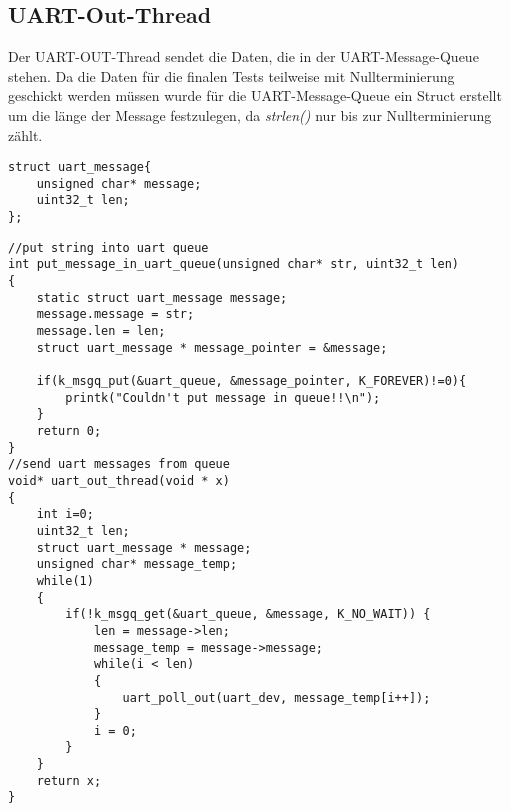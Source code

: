 \newpage
\subsection{UART-Out-Thread}
Der UART-OUT-Thread sendet die Daten, die in der UART-Message-Queue stehen. 
Da die Daten für die finalen Tests teilweise mit Nullterminierung geschickt werden müssen wurde für die UART-Message-Queue ein Struct 
erstellt um die länge der Message festzulegen, da \textit{strlen()} nur bis zur Nullterminierung zählt.
\begin{lstlisting}[style=StyleC, captionpos=b, caption=uart\_message-struct label=uart-message-struct]
struct uart_message{
    unsigned char* message; 
    uint32_t len; 
};
\end{lstlisting}
\begin{lstlisting}[style=StyleC, captionpos=b, caption=UART-OUT-Thread, label=UART-OUT-Thread]
//put string into uart queue
int put_message_in_uart_queue(unsigned char* str, uint32_t len)
{	
    static struct uart_message message; 
    message.message = str; 
    message.len = len;
    struct uart_message * message_pointer = &message;
    
    if(k_msgq_put(&uart_queue, &message_pointer, K_FOREVER)!=0){
        printk("Couldn't put message in queue!!\n");
    }
    return 0;
}    
//send uart messages from queue
void* uart_out_thread(void * x)
{
	int i=0;
	uint32_t len; 
	struct uart_message * message;
	unsigned char* message_temp;
	while(1)
	{
		if(!k_msgq_get(&uart_queue, &message, K_NO_WAIT)) {
			len = message->len;
			message_temp = message->message; 
			while(i < len)
			{
				uart_poll_out(uart_dev, message_temp[i++]);
			}
			i = 0;
		}
	}
	return x;
}        
\end{lstlisting}


\newpage
